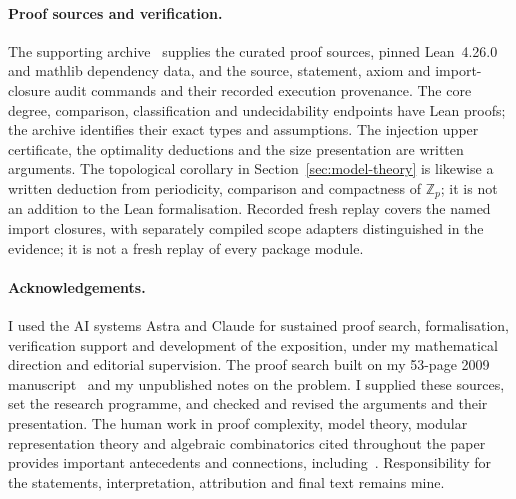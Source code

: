 \documentclass[11pt,a4paper]{article}
\theoremstyle{definition}\newtheorem{definition}[theorem]{Definition}
\theoremstyle{remark}\newtheorem{remark}[theorem]{Remark}
\begin{document}
\paragraph{Proof sources and verification.}
The supporting archive~\cite{RiisSupporting} supplies the
curated proof sources, pinned Lean~4.26.0 and mathlib dependency data,
and the source, statement, axiom and import-closure audit commands
and their recorded execution provenance. The core degree, comparison,
classification and undecidability endpoints have Lean proofs; the
archive identifies their exact types and assumptions. The injection
upper certificate, the optimality deductions and the size presentation
are written arguments. The topological corollary in
Section~\ref{sec:model-theory} is likewise a written deduction from
periodicity, comparison and compactness of $\mathbb Z_p$; it is not
an addition to the Lean formalisation. Recorded fresh replay covers the named import
closures, with separately compiled scope adapters distinguished in the
evidence; it is not a fresh replay of every package module.

\paragraph{Acknowledgements.}
I used the AI systems Astra and Claude for sustained proof search,
formalisation, verification support and development of the exposition,
under my mathematical direction and editorial supervision. The proof
search built on my 53-page 2009 manuscript~\cite{RiisLong} and my
unpublished notes on the problem. I supplied these sources, set the
research programme, and checked and revised the arguments and their
presentation. The human work in proof complexity,
model theory, modular representation theory and algebraic combinatorics
cited throughout the paper provides important antecedents and connections,
including~\cite{NSFoundations,PCFoundations,Ajtai,Krajicek,KrajEuler,
BussDesign,BeameRiis,RiisSitharamTautologies,RiisSitharamModules,
CEF,Harman,HKPSYZ,BDM}. Responsibility
for the statements, interpretation, attribution and final text remains mine.
\end{document}
